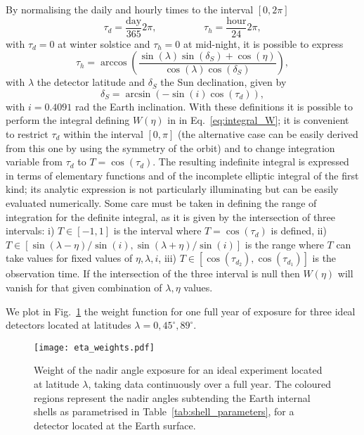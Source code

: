 \documentclass{article}
\begin{document}
By normalising the daily and hourly times to the interval $[0, 2 \pi]$
\begin{equation}
	\tau_d = \frac{\text{day}}{365} 2\pi, \hspace{2cm} \tau_h = \frac{\text{hour}}{24} 2\pi,
\end{equation}
with $\tau_d=0$ at winter solstice and $\tau_h=0$ at mid-night, it is possible to express
\begin{equation}
	\tau_h = \arccos\left(\frac{\sin(\lambda) \sin(\delta_S) + \cos(\eta)}{\cos(\lambda) \cos(\delta_S)} \right),
\end{equation}
with $\lambda$ the detector latitude and $\delta_S$ the Sun declination, given by
\begin{equation}
	\delta_S = \arcsin\left(-\sin(i) \cos(\tau_d)\right),
\end{equation}
with $i=0.4091$ rad the Earth inclination. With these definitions it is possible to perform the integral defining $W(\eta)$ in in Eq.~\ref{eq:integral_W}; it is convenient to restrict $\tau_d$ within the interval $[0, \pi]$ (the alternative case can be easily derived from this one by using the symmetry of the orbit) and to change integration variable from $\tau_d$ to $T = \cos(\tau_d)$. 
The resulting indefinite integral is expressed in terms of elementary functions and of the incomplete elliptic integral of the first kind; its analytic expression is not particularly illuminating but can be easily evaluated numerically.
Some care must be taken in defining the range of integration for the definite integral, as it is given by the intersection of three intervals: i) $T \in [-1, 1]$ is the interval where $T=\cos(\tau_d)$ is defined, ii) $T \in [\sin(\lambda - \eta)/\sin(i), \sin(\lambda + \eta)/\sin(i)]$ is the range where $T$ can take values for fixed values of $\eta, \lambda, i$, iii) $T \in [\cos(\tau_{d_2}), \cos(\tau_{d_1})]$ is the observation time. If the intersection of the three interval is null then $W(\eta)$ will vanish for that given combination of $\lambda, \eta$ values.

We plot in Fig.~\ref{fig:eta_weights} the weight function for one full year of exposure for three ideal detectors located at latitudes $\lambda = 0, 45^\circ, 89^\circ$.
\begin{figure}[ht]
	\texttt{[image: eta\_weights.pdf]}	
	\caption{Weight of the nadir angle exposure for an ideal experiment located at latitude $\lambda$, taking data continuously over a full year. The coloured regions represent the nadir angles subtending the Earth internal shells as parametrised in Table~\ref{tab:shell_parameters}, for a detector located at the Earth surface.}
	\label{fig:eta_weights}
\end{figure}



\end{document}
